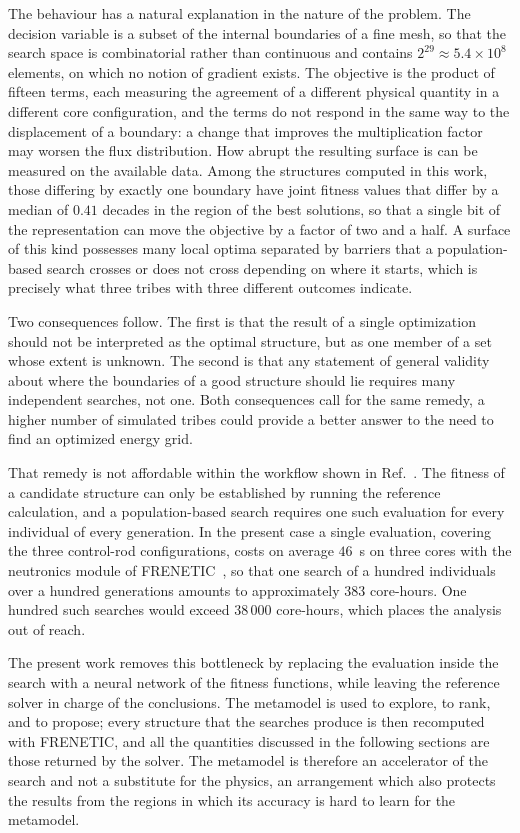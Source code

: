 \documentclass{style/nseJournal}
\begin{document}
The behaviour has a natural explanation in the nature of the problem. The
decision variable is a subset of the internal boundaries of a fine mesh, so that
the search space is combinatorial rather than continuous and contains
$2^{29}\approx5.4\times10^{8}$ elements, on which no notion of gradient exists.
The objective is the product of fifteen terms, each measuring the agreement of a
different physical quantity in a different core configuration, and the terms do
not respond in the same way to the displacement of a boundary: a change that
improves the multiplication factor may worsen the flux distribution. How abrupt
the resulting surface is can be measured on the available data. Among the
structures computed in this work, those differing by exactly one boundary have
joint fitness values that differ by a median of $0.41$ decades in the region of
the best solutions, so that a single bit of the
representation can move the objective by a factor of two and a half. A surface
of this kind possesses many local optima separated by barriers that a
population-based search crosses or does not cross depending on where it starts,
which is precisely what three tribes with three different outcomes indicate.

Two consequences follow. The first is that the result of a single optimization
should not be interpreted as the optimal structure, but as one member of a set
whose extent is unknown. The second is that any statement of general validity
about where the boundaries of a good structure should lie requires many
independent searches, not one. Both consequences call for the same remedy, a higher
number of simulated tribes could provide a better answer to the need to find an optimized
energy grid.

That remedy is not affordable within the workflow shown in Ref.~\cite{prevMulti}. The fitness of a
candidate structure can only be established by running the reference
calculation, and a population-based search requires one such evaluation for
every individual of every generation. In the present case a single evaluation,
covering the three control-rod configurations, costs on average $46$~s on three cores with
the neutronics module of FRENETIC~\cite{frenetic,freneticBench}, so that one
search of a hundred individuals over a hundred generations amounts to
approximately $383$ core-hours. One hundred such searches would exceed
$38\,000$ core-hours, which places the analysis out of reach.

The present work removes this bottleneck by replacing the evaluation inside the
search with a neural network of the fitness functions, while leaving the
reference solver in charge of the conclusions. The metamodel is used to explore,
to rank, and to propose; every structure that the searches produce is then
recomputed with FRENETIC, and all the quantities discussed in the following
sections are those returned by the solver. The metamodel is therefore an
accelerator of the search and not a substitute for the physics, an arrangement
which also protects the results from the regions in which its accuracy is hard to
learn for the metamodel.
\end{document}
